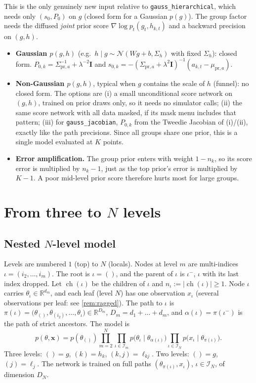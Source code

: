 \documentclass[11pt]{article}
\theoremstyle{definition}
\theoremstyle{remark}
\newcommand{\R}{\mathbb{R}}
\newcommand{\N}{\mathcal{N}}
\newcommand{\I}{\mathbf{I}}
\newcommand{\lam}{\lambda}
\newcommand{\X}{\mathbf{x}}
\newcommand{\ch}{\operatorname{ch}}
\newcommand{\arrowm}{\texttt{gauss\_\allowbreak hierarchical}}
\newcommand{\quiver}{\texttt{gauss\_\allowbreak jacobian}}
\newcommand{\hk}{h_k}
\newcommand{\lkj}{\ell_{kj}}
\begin{document}
This is the only genuinely new input relative to \arrowm, which needs only
$(s_0,P_0)$ on $g$ (closed form for a Gaussian $p(g)$). The group factor needs
the diffused \emph{joint} prior score $\nabla\log p_t(g_t,h_{k,t})$ and a backward
precision on $(g,h)$.
\begin{itemize}
\item \textbf{Gaussian $p(g,h)$} (e.g.\ $h\mid g\sim\N(Wg+b,\Sigma_h)$ with fixed
 $\Sigma_h$): closed form. $P_{0,k}=\Sigma_{\text{pr},a}^{-1}+\lam^{-2}\I$ and
 $s_{0,k}=-(\Sigma_{\text{pr},a}+\lam^2\I)^{-1}(a_{k,t}-\mu_{\text{pr},a})$.
\item \textbf{Non-Gaussian $p(g,h)$}, typical when $g$ contains the scale of $h$
 (funnel): no closed form. The options are (i) a small unconditional score network
 on $(g,h)$, trained on prior draws only, so it needs no simulator calls; (ii) the
 same score network with all data masked, if its mask menu includes that pattern;
 (iii) for \quiver, $P_{0,k}$ from the Tweedie Jacobian of (i)/(ii), exactly like
 the path precisions. Since all groups share one prior, this is a single model
 evaluated at $K$ points.
\item \textbf{Error amplification.} The group prior enters with weight $1-n_k$,
 so its score error is multiplied by $n_k-1$, just as the top prior's error is
 multiplied by $K-1$. A poor mid-level prior score therefore hurts most for large
 groups.
\end{itemize}

\section{From three to $N$ levels}\label{sec:nlevel}

\subsection{Nested $N$-level model}

Levels are numbered $1$ (top) to $N$ (locals). Nodes at level $m$ are multi-indices
$\iota=(i_2,\dots,i_m)$. The root is $\iota=()$, and the parent of $\iota$ is
$\iota^-$, $\iota$ with its last index dropped. Let $\ch(\iota)$ be the children
of $\iota$ and $n_\iota:=|\ch(\iota)|\ge1$. Node $\iota$ carries
$\theta_\iota\in\R^{d_m}$, and each leaf (level $N$) has one observation $x_\iota$
(several observations per leaf: see \cref{rem:ragged}). The path to $\iota$ is
$\pi(\iota)=\big(\theta_{()},\theta_{(i_2)},\dots,\theta_\iota\big)\in\R^{D_m}$,
$D_m=d_1+\dots+d_m$, and $\alpha(\iota)=\pi(\iota^-)$ is the path of strict
ancestors. The model is
\begin{equation}\label{eq:nmodel}
p(\theta,\X)=p(\theta_{()})\prod_{m=2}^{N}\prod_{\iota\in\mathcal{I}_m}p\big(\theta_\iota\mid\theta_{\alpha(\iota)}\big)\prod_{\iota\in\mathcal{I}_N}p\big(x_\iota\mid\theta_{\pi(\iota)}\big).
\end{equation}
Three levels: $()=g$, $(k)=\hk$, $(k,j)=\lkj$. Two levels: $()=g$, $(j)=\ell_j$.
The network is trained on full paths $(\theta_{\pi(\iota)},x_\iota)$, $\iota\in\mathcal{I}_N$,
of dimension $D_N$.
\end{document}
